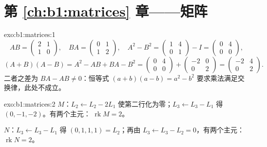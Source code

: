 \section*{第 \ref{ch:b1:matrices} 章——矩阵}

\begin{solution}{exo:b1:matrices:1}
\[
AB = \begin{pmatrix} 2 & 1\\ 1 & 0\end{pmatrix},
\quad
BA = \begin{pmatrix} 0 & 1\\ 1 & 2\end{pmatrix},
\quad
A^2 - B^2 = \begin{pmatrix} 1 & 4\\ 0 & 1\end{pmatrix} - I
= \begin{pmatrix} 0 & 4\\ 0 & 0\end{pmatrix},
\]
\[
(A+B)(A-B) = A^2 - AB + BA - B^2
= \begin{pmatrix} 0 & 4\\ 0 & 0\end{pmatrix} +
\begin{pmatrix} -2 & 0\\ 0 & 2 \end{pmatrix}
= \begin{pmatrix} -2 & 4\\ 0 & 2\end{pmatrix}.
\]
二者之差为 $BA - AB \neq 0$：恒等式 $(a+b)(a-b) = a^2 -
b^2$ 要求乘法满足交换律，此处不成立。
\end{solution}

\begin{solution}{exo:b1:matrices:2}
$M$：$L_2 \leftarrow L_2 - 2L_1$ 使第二行化为零；$L_3
\leftarrow L_3 - L_1$ 得 $(0, -1, -2)$。有两个主元：
$\operatorname{rk} M = 2$。

$N$：$L_3 \leftarrow L_3 - L_1$ 得 $(0,1,1,1) = L_2$；再由 $L_3
\leftarrow L_3 - L_2 = 0$，有两个主元：$\operatorname{rk} N = 2$。
\end{solution}

